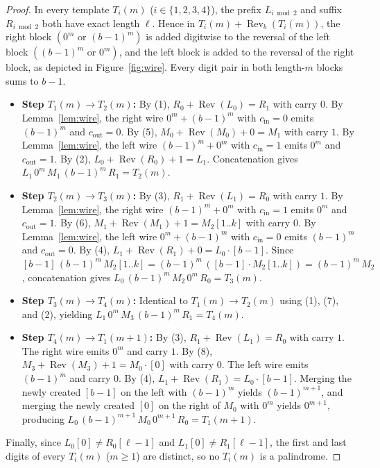 \documentclass[11pt,a4paper]{article}
\theoremstyle{definition}
\theoremstyle{remark}
\begin{document}
\begin{proof}
In every template $T_i(m)$ ($i \in \{1,2,3,4\}$), the prefix $L_{i\bmod 2}$ and suffix $R_{i\bmod 2}$ both have exact length $\ell$. Hence in $T_i(m) + \operatorname{Rev}_b(T_i(m))$, the right block $(0^m \text{ or } (b-1)^m)$ is added digitwise to the reversal of the left block $((b-1)^m \text{ or } 0^m)$, and the left block is added to the reversal of the right block, as depicted in Figure~\ref{fig:wire}. Every digit pair in both length-$m$ blocks sums to $b-1$.
\begin{itemize}
  \item \textbf{Step $T_1(m) \to T_2(m)$:} By (1), $R_0 + \operatorname{Rev}(L_0) = R_1$ with carry $0$. By Lemma~\ref{lem:wire}, the right wire $0^m + (b-1)^m$ with $c_{\mathrm{in}} = 0$ emits $(b-1)^m$ and $c_{\mathrm{out}} = 0$. By (5), $M_0 + \operatorname{Rev}(M_0) + 0 = M_1$ with carry $1$. By Lemma~\ref{lem:wire}, the left wire $(b-1)^m + 0^m$ with $c_{\mathrm{in}} = 1$ emits $0^m$ and $c_{\mathrm{out}} = 1$. By (2), $L_0 + \operatorname{Rev}(R_0) + 1 = L_1$. Concatenation gives $L_1 \, 0^m \, M_1 \, (b-1)^m \, R_1 = T_2(m)$.
  \item \textbf{Step $T_2(m) \to T_3(m)$:} By (3), $R_1 + \operatorname{Rev}(L_1) = R_0$ with carry $1$. By Lemma~\ref{lem:wire}, the right wire $(b-1)^m + 0^m$ with $c_{\mathrm{in}} = 1$ emits $0^m$ and $c_{\mathrm{out}} = 1$. By (6), $M_1 + \operatorname{Rev}(M_1) + 1 = M_2[1..k]$ with carry $0$. By Lemma~\ref{lem:wire}, the left wire $0^m + (b-1)^m$ with $c_{\mathrm{in}} = 0$ emits $(b-1)^m$ and $c_{\mathrm{out}} = 0$. By (4), $L_1 + \operatorname{Rev}(R_1) + 0 = L_0 \cdot [b-1]$. Since $[b-1] \, (b-1)^m \, M_2[1..k] = (b-1)^m \, ([b-1] \cdot M_2[1..k]) = (b-1)^m \, M_2$, concatenation gives $L_0 \, (b-1)^m \, M_2 \, 0^m \, R_0 = T_3(m)$.
  \item \textbf{Step $T_3(m) \to T_4(m)$:} Identical to $T_1(m) \to T_2(m)$ using (1), (7), and (2), yielding $L_1 \, 0^m \, M_3 \, (b-1)^m \, R_1 = T_4(m)$.
  \item \textbf{Step $T_4(m) \to T_1(m+1)$:} By (3), $R_1 + \operatorname{Rev}(L_1) = R_0$ with carry $1$. The right wire emits $0^m$ and carry $1$. By (8), $M_3 + \operatorname{Rev}(M_3) + 1 = M_0 \cdot [0]$ with carry $0$. The left wire emits $(b-1)^m$ and carry $0$. By (4), $L_1 + \operatorname{Rev}(R_1) = L_0 \cdot [b-1]$. Merging the newly created $[b-1]$ on the left with $(b-1)^m$ yields $(b-1)^{m+1}$, and merging the newly created $[0]$ on the right of $M_0$ with $0^m$ yields $0^{m+1}$, producing $L_0 \, (b-1)^{m+1} \, M_0 \, 0^{m+1} \, R_0 = T_1(m+1)$.
\end{itemize}
Finally, since $L_0[0] \neq R_0[\ell-1]$ and $L_1[0] \neq R_1[\ell-1]$, the first and last digits of every $T_i(m)$ ($m \ge 1$) are distinct, so no $T_i(m)$ is a palindrome.
\end{proof}
\end{document}
